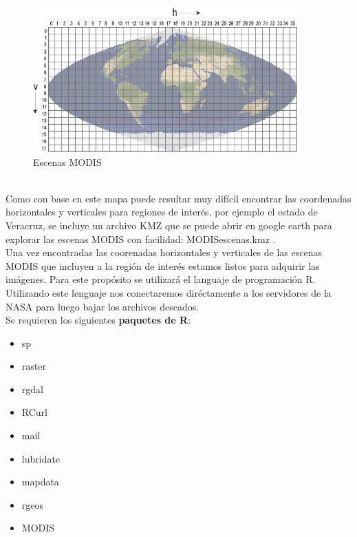 \\
\begin{figure}[h!]
\begin{center}
\leavevmode
\includegraphics[width=4in]{9_modis_cuadricula.png}
\end{center}
\caption{Escenas MODIS}
\end{figure}
\\

Como con base en este mapa puede resultar muy difícil encontrar las coordenadas horizontales y verticales para regiones de interés, por ejemplo el estado de Veracruz, se incluye un archivo KMZ que se puede abrir en google earth para explorar las escenas MODIS con facilidad: MODISescenas.kmz . \\

Una vez encontradas las coorenadas horizontales y verticales de las escenas MODIS que incluyen a la región de interés estamos listos para adquirir las imágenes. Para este propósito se utilizará el languaje de programación R. Utilizando este lenguaje nos conectaremos diréctamente a los servidores de la NASA para luego bajar los archivos deseados.\\

Se requieren los siguientes \textbf{paquetes de R}:
\\ 

\begin{itemize}
	\item sp
	\item raster
	\item rgdal
	\item RCurl
	\item mail
	\item lubridate
	\item mapdata
	\item rgeos
	\item MODIS 
	
\end{itemize}


